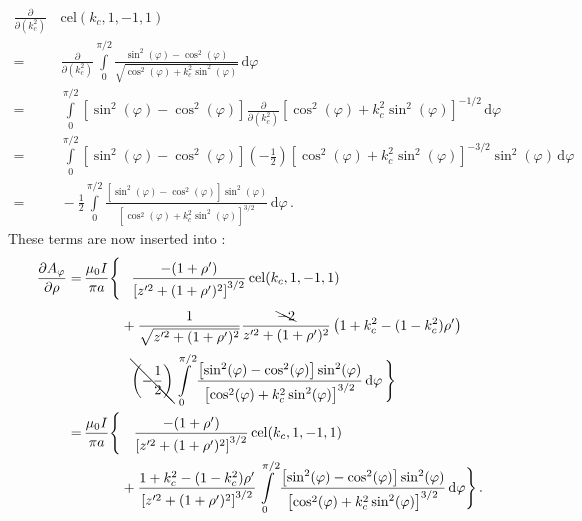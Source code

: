 \begin{align}
 \frac{\partial}{\partial (k_c^2)}& \,\mathrm{cel}(k_c, 1, -1, 1) \nonumber \\
 =&\, \frac{\partial}{\partial (k_c^2)} \int\limits_0^{\pi/2} \frac{\sin^2(\varphi) - \cos^2(\varphi)}
                                                                   {\sqrt{\cos^2(\varphi) + k_c^2 \sin^2(\varphi)}} \,\mathrm{d}\varphi \nonumber \\
 =&\, \int\limits_0^{\pi/2} \left[ \sin^2(\varphi) - \cos^2(\varphi) \right]
        \frac{\partial}{\partial (k_c^2)} \left[ \cos^2(\varphi) + k_c^2 \sin^2(\varphi) \right]^{-1/2} \,\mathrm{d}\varphi \nonumber \\
 =&\, \int\limits_0^{\pi/2} \left[ \sin^2(\varphi) - \cos^2(\varphi) \right]
        \left(-\frac{1}{2}\right) \left[ \cos^2(\varphi) + k_c^2 \sin^2(\varphi) \right]^{-3/2} \sin^2(\varphi) \,\mathrm{d}\varphi \nonumber \\
 =&\, -\frac{1}{2} \int\limits_0^{\pi/2} \frac{\left[\sin^2(\varphi) - \cos^2(\varphi) \right] \sin^2(\varphi)}
                                              {\left[\cos^2(\varphi) + k_c^2 \sin^2(\varphi) \right]^{3/2}}  \,\mathrm{d}\varphi \, .
\end{align}
These terms are now inserted into :
\begin{align}
      \frac{\partial A_\varphi}{\partial \rho}
 =&\, \frac{\mu_0 I}{\pi a} \Biggl\{ \phantom{+}
        \frac{-(1+\rho')}{\left[z'^2 + (1 + \rho')^2\right]^{3/2}} \,\mathrm{cel}(k_c, 1, -1, 1) \nonumber \\
 ~&\, \phantom{\frac{\mu_0 I}{\pi a} \Biggl\{}         +
        \frac{1}{\sqrt{z'^2 + (1 + \rho')^2}}
        \frac{\bcancel{-2}}{z'^2 + (1 + \rho')^2} \left(1 + k_c^2 - (1 - k_c^2) \rho' \right) \nonumber \\
 ~&\, \phantom{\frac{\mu_0 I}{\pi a} \Biggl\{ +}
        \bcancel{\left(-\frac{1}{2} \right)}
        \int\limits_0^{\pi/2}
          \frac{\left[\sin^2(\varphi) - \cos^2(\varphi) \right] \sin^2(\varphi)}
               {\left[\cos^2(\varphi) + k_c^2 \sin^2(\varphi) \right]^{3/2}}  \,\mathrm{d}\varphi \, \Biggr\} \nonumber \\
 =&\, \frac{\mu_0 I}{\pi a} \Biggl\{
      \phantom{+}\,
      \frac{-(1 + \rho')}{\left[z'^2 + (1 + \rho')^2\right]^{3/2}}
      \,\mathrm{cel}(k_c, 1, -1, 1) \nonumber \\
 ~&\, \phantom{\frac{\mu_0 I}{\pi a} \Biggl\{}
      + \frac{1 + k_c^2 - (1 - k_c^2) \rho'}{\left[z'^2 + (1 + \rho')^2\right]^{3/2}}
        \int\limits_0^{\pi/2}
          \frac{\left[\sin^2(\varphi) - \cos^2(\varphi) \right] \sin^2(\varphi)}
               {\left[\cos^2(\varphi) + k_c^2 \sin^2(\varphi) \right]^{3/2}}  \,\mathrm{d}\varphi \Biggr\} \, .
\end{align}

